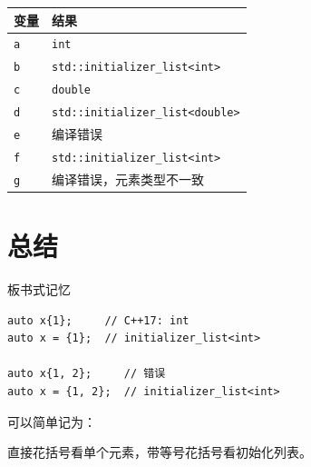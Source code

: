 \documentclass[UTF8,12pt,a4paper]{ctexart}
\begin{document}
\begin{center}
\begin{tabular}{ll}
\toprule
变量 & 结果 \\
\midrule
\texttt{a} & \texttt{int} \\
\texttt{b} & \texttt{std::initializer\_list<int>} \\
\texttt{c} & \texttt{double} \\
\texttt{d} & \texttt{std::initializer\_list<double>} \\
\texttt{e} & 编译错误 \\
\texttt{f} & \texttt{std::initializer\_list<int>} \\
\texttt{g} & 编译错误，元素类型不一致 \\
\bottomrule
\end{tabular}
\end{center}

\section{总结}

\begin{conceptbox}{板书式记忆}
\begin{lstlisting}
auto x{1};     // C++17: int
auto x = {1};  // initializer_list<int>

auto x{1, 2};     // 错误
auto x = {1, 2};  // initializer_list<int>
\end{lstlisting}
\end{conceptbox}

可以简单记为：

\begin{center}
直接花括号看单个元素，带等号花括号看初始化列表。
\end{center}
\end{document}
